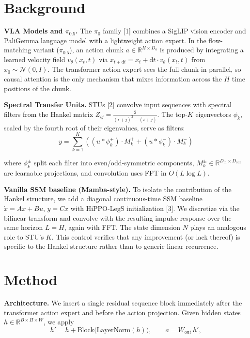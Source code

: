 \documentclass[10pt, letterpaper]{article}
\begin{document}
\section*{Background}

\textbf{VLA Models and $\pi_{0.5}$.}
The $\pi_0$ family [1] combines a SigLIP vision encoder and PaliGemma language model with a lightweight action expert. In the flow-matching variant ($\pi_{0.5}$), an action chunk $a \in \mathbb{R}^{H \times D_a}$ is produced by integrating a learned velocity field $v_\theta(x_t, t)$ via $x_{t+\mathrm{d}t} = x_t + \mathrm{d}t \cdot v_\theta(x_t, t)$ from $x_0 \sim \mathcal{N}(0, I)$. The transformer action expert sees the full chunk in parallel, so causal attention is the only mechanism that mixes information across the $H$ time positions of the chunk.

\textbf{Spectral Transfer Units.}
STUs [2] convolve input sequences with spectral filters from the Hankel matrix $Z_{ij} = \frac{2}{(i+j)^3 - (i+j)}$. The top-$K$ eigenvectors $\phi_k$, scaled by the fourth root of their eigenvalues, serve as filters:
\vspace{-0.5em}
\begin{equation}
y = \textstyle\sum_{k=1}^{K} \left( (u * \phi_k^+) \cdot M_k^+ + (u * \phi_k^-) \cdot M_k^- \right)
\end{equation}
\vspace{-0.7em}

\noindent where $\phi_k^\pm$ split each filter into even/odd-symmetric components, $M_k^{\pm} \in \mathbb{R}^{D_{\text{in}} \times D_{\text{out}}}$ are learnable projections, and convolution uses FFT in $O(L \log L)$.

\textbf{Vanilla SSM baseline (Mamba-style).}
To isolate the contribution of the Hankel structure, we add a diagonal continuous-time SSM baseline $\dot{x} = A x + B u,\, y = C x$ with HiPPO-LegS initialization [3]. We discretize via the bilinear transform and convolve with the resulting impulse response over the same horizon $L = H$, again with FFT. The state dimension $N$ plays an analogous role to STU's $K$. This control verifies that any improvement (or lack thereof) is specific to the Hankel structure rather than to generic linear recurrence.

\section*{Method}

\textbf{Architecture.}
We insert a single residual sequence block immediately after the transformer action expert and before the action projection. Given hidden states $h \in \mathbb{R}^{B \times H \times W}$, we apply
\vspace{-0.4em}
\begin{equation}
h' = h + \mathrm{Block}\bigl(\mathrm{LayerNorm}(h)\bigr), \qquad a = W_{\mathrm{out}}\, h',
\end{equation}
\vspace{-0.7em}
\end{document}
